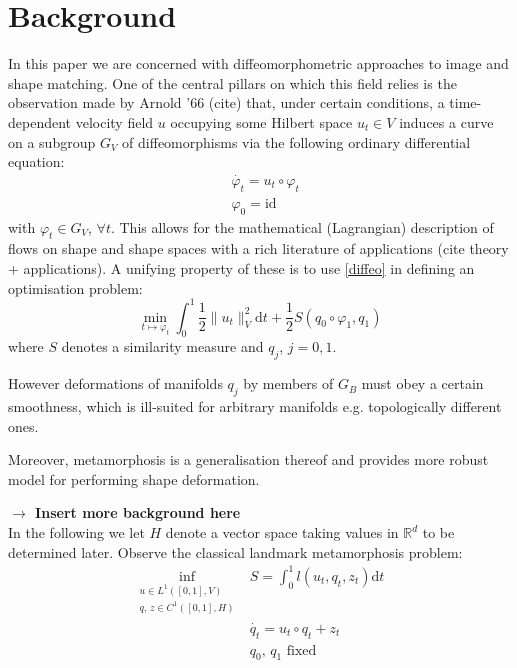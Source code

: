 \documentclass[runningheads]{llncs}
\newcommand{\half}{\frac 12}
\newcommand{\norm}[2]{\| #1 \|_{ #2 }}
\newcommand{\vnorm}[1]{\norm{ #1 }{V}}
\newcommand{\diff}[1]{\text{d} #1}
\newcommand{\Rd}{\mathbb{R}^{d}}
\begin{document}
\section{Background}\label{sec:bg}

In this paper we are concerned with diffeomorphometric approaches to image and
shape matching. One of the central pillars on which this field relies is the
observation made by Arnold '66 (cite) that, under certain conditions, a
time-dependent velocity field $u$ occupying some Hilbert space $u_t \in V$
induces a curve on a subgroup $G_V$ of diffeomorphisms \cite{younes2010shapes}
via the following ordinary differential
equation:
\begin{align}
& \dot{\varphi_t} = u_t \circ \varphi_t\\
& \varphi_0 = \text{id}
  \label{diffeo}
\end{align}
with $\varphi_t \in G_V$, $\forall t$. This allows for the mathematical
(Lagrangian) description of flows on shape and shape spaces with a rich
literature of applications (cite theory + applications). A unifying property of
these is to use \eqref{diffeo} in defining an optimisation problem:
\[
\min_{t \mapsto \varphi_t} \int_0^1 \half\vnorm{u_t}^2 \diff{t} + \half S(q_0\circ\varphi_1, q_1)
\]
where $S$ denotes a similarity measure and $q_j$, $j=0,1$.

However deformations of manifolds $q_j$ by members of $G_B$ must obey a certain
smoothness, which is ill-suited for arbitrary manifolds e.g. topologically
different ones.

Moreover, metamorphosis is a generalisation thereof and provides more robust
model for performing shape deformation.

\textbf{$\longrightarrow$ Insert more background here}\\

In the following we let $H$ denote a vector space taking values in $\Rd$ to be determined later.
Observe the classical landmark metamorphosis problem:
\begin{align}
\inf_{\substack{u\in L^1([0,1],V)\\q,\, z \in C^1([0,1], H)}} & S = \int_0^1
l(u_t, q_t, z_t)\diff{t}\\
    & \dot{q_t} = u_t \circ q_t + z_t \\
    & q_0,\,q_1\text{ fixed}
\end{align}
\end{document}
